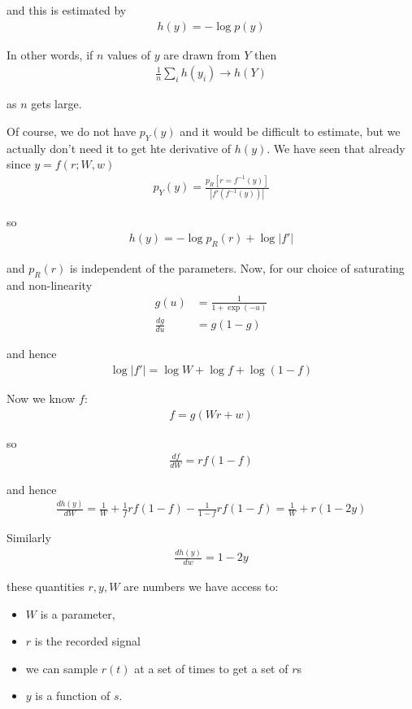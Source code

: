 \documentclass[11pt,a4paper,titlepage,dvipsnames,cmyk]{scrartcl}
\begin{document}
and this is estimated by
\begin{align*}
h(y) = -\log p(y)
\end{align*}

In other words, if $n$ values of $y$ are drawn from $Y$ then
\begin{align*}
\frac{1}{n} \sum_i h(y_i) \rightarrow h(Y)
\end{align*}

as $n$ gets large.

Of course, we do not have $p_Y(y)$ and it would be difficult to estimate, but we actually don't need it to get hte derivative of $h(y)$. We have seen that already since $y = f(r;W,w)$
\begin{align*}
p_Y(y) = \frac{p_R[r = f^{-1}(y)]}{|f'(f^{-1}(y))|}
\end{align*}

so
\begin{align*}
h(y) = -\log p_R (r) + \log |f'|
\end{align*}

and $p_R(r)$ is independent of the parameters. Now, for our choice of saturating and non-linearity
\begin{align*}
g(u) &= \frac{1}{1 + \exp(-u)} \\
\frac{dg}{du} &= g(1-g)
\end{align*}

and hence
\begin{align*}
\log |f'| = \log W + \log f + \log (1-f)
\end{align*}

Now we know $f$:
\begin{align*}
f = g(Wr + w)
\end{align*}

so
\begin{align*}
\frac{df}{dW} = rf(1-f)
\end{align*}

and hence
\begin{align*}
\frac{dh(y)}{dW} = \frac{1}{W} + \frac{1}{f}rf(1-f) - \frac{1}{1-f}rf(1-f) = \frac{1}{W} + r(1-2y)
\end{align*}

Similarly
\begin{align*}
\frac{dh(y)}{dw} = 1-2y
\end{align*}

these quantities $r,y,W$ are numbers we have access to:
\begin{itemize}
    \item $W$ is a parameter,
    \item $r$ is the recorded signal
    \item we can sample $r(t)$ at a set of times to get a set of $r$s
    \item $y$ is a function of $s$.
\end{itemize}
\end{document}
